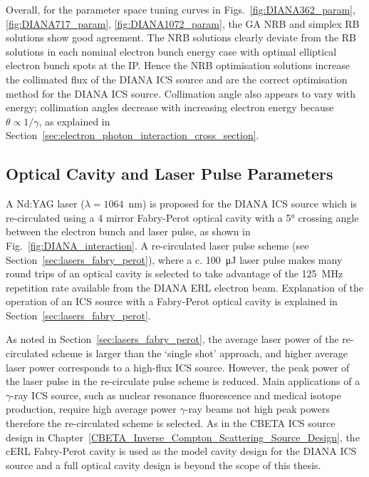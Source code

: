 \documentclass[../main.tex]{subfiles}
\begin{document}
Overall, for the parameter space tuning curves in Figs.~\ref{fig:DIANA362_param}, \ref{fig:DIANA717_param}, \ref{fig:DIANA1072_param}, the GA NRB and simplex RB solutions show good agreement. The NRB solutions clearly deviate from the RB solutions in each nominal electron bunch energy case with optimal elliptical electron bunch spots at the IP. Hence the NRB optimisation solutions increase the collimated flux of the DIANA ICS source and are the correct optimisation method for the DIANA ICS source. Collimation angle also appears to vary with energy; collimation angles decrease with increasing electron energy because $\theta \propto 1/\gamma$, as explained in Section~\ref{sec:electron_photon_interaction_cross_section}.  

\subsection{Optical Cavity and Laser Pulse Parameters}
\label{sec:DIANA_laser_fabry_perot}

A Nd:YAG laser ($\lambda = 1064$~\si{\nano\meter}) is proposed for the DIANA ICS source which is re-circulated using a 4 mirror Fabry-Perot optical cavity with a 5\si{\degree} crossing angle between the electron bunch and laser pulse, as shown in Fig.~\ref{fig:DIANA_interaction}. A re-circulated laser pulse scheme (see Section~\ref{sec:lasers_fabry_perot}), where a c. 100~\si{\micro\joule} laser pulse makes many round trips of an optical cavity is selected to take advantage of the 125~\si{\mega\hertz} repetition rate available from the DIANA ERL electron beam. Explanation of the operation of an ICS source with a Fabry-Perot optical cavity is explained in Section~\ref{sec:lasers_fabry_perot}.

As noted in Section~\ref{sec:lasers_fabry_perot}, the average laser power of the re-circulated scheme is larger than the `single shot' approach, and higher average laser power corresponds to a high-flux ICS source. However, the peak power of the laser pulse in the re-circulate pulse scheme is reduced. Main applications of a $\gamma$-ray ICS source, such as nuclear resonance fluorescence and medical isotope production, require high average power $\gamma$-ray beams not high peak powers therefore the re-circulated scheme is selected. As in the CBETA ICS source design in Chapter~\ref{CBETA_Inverse_Compton_Scattering_Source_Design}, the cERL Fabry-Perot cavity \cite{akagi2016narrow} is used as the model cavity design for the DIANA ICS source and a full optical cavity design is beyond the scope of this thesis.
\end{document}

